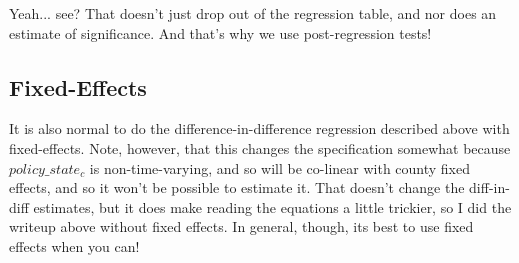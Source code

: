 \documentclass[12pt]{article}
\begin{document}
Yeah... see? That doesn't just drop out of the regression table, and nor does an estimate of significance. And that's why we use post-regression tests!

\subsection*{Fixed-Effects}

It is also normal to do the difference-in-difference regression described above with fixed-effects. Note, however, that this changes the specification somewhat because $policy\_state_{c}$ is non-time-varying,  and so will be co-linear with county fixed effects, and so it won't be possible to estimate it. That doesn't change the diff-in-diff estimates, but it does make reading the equations a little trickier, so I did the writeup above without fixed effects. In general, though, its best to use fixed effects when you can!
\end{document}
